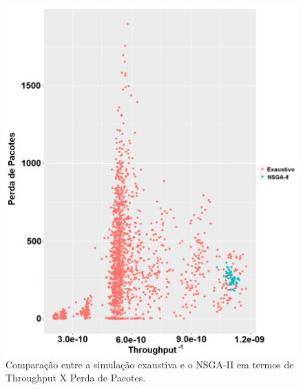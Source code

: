\documentclass[conference]{IEEEtran}
\begin{document}
\begin{figure}[h]
  \centering
  \includegraphics[scale=0.27]{figures/ExaustivoXNsgaii_ThroughputXPerdaPacotes.png}
  \caption{Comparação entre a simulação exaustiva e o NSGA-II em termos de Throughput X Perda de Pacotes.}
  \label{fig:exaustivo-nsgaii-2}
\end{figure}
\end{document}
